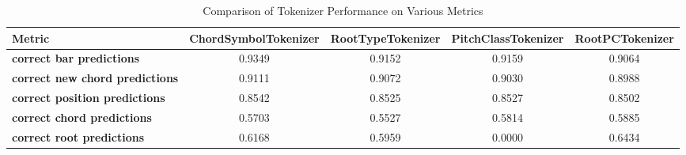 
\begin{table}[h]
    \centering
    \renewcommand{\arraystretch}{1.2}
    \begin{tabular}{lcccc}
        \hline
        \textbf{Metric} & \textbf{ChordSymbolTokenizer} & \textbf{RootTypeTokenizer} & \textbf{PitchClassTokenizer} & \textbf{RootPCTokenizer} \\
        \hline
        \textbf{correct bar predictions} & 0.9349 & 0.9152 & 0.9159 & 0.9064 \\
    \textbf{correct new chord predictions} & 0.9111 & 0.9072 & 0.9030 & 0.8988 \\
    \textbf{correct position predictions} & 0.8542 & 0.8525 & 0.8527 & 0.8502 \\
    \textbf{correct chord predictions} & 0.5703 & 0.5527 & 0.5814 & 0.5885 \\
    \textbf{correct root predictions} & 0.6168 & 0.5959 & 0.0000 & 0.6434 \\
    \hline
    \end{tabular}
    \caption{Comparison of Tokenizer Performance on Various Metrics}
    \label{tab:tokenizer_performance}
\end{table}
    